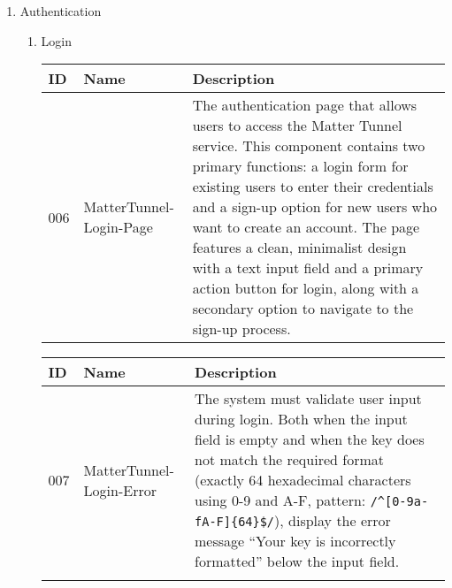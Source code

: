 \documentclass[conference]{IEEEtran}
\begin{document}
\begin{enumerate}[itemsep=2ex, parsep=1ex]
	\item Authentication
	      \begin{enumerate}[itemsep=2ex, parsep=1ex]
	      	\item Login
	      	      \begin{table}[h!]
	      	      	\def\arraystretch{1.24} \small
	      	      	\begin{tabular}{|p{1.2cm}|p{2.5cm}|p{4.0cm}|}
	      	      		\hline
	      	      		ID  & Name                    & Description                                                                                                                                                                                                                                                                                                                                                                                                                              \\
	      	      		\hline
	      	      		006 & MatterTunnel-Login-Page & The authentication page that allows users to access the Matter Tunnel service. This component contains two primary functions: a login form for existing users to enter their credentials and a sign-up option for new users who want to create an account. The page features a clean, minimalist design with a text input field and a primary action button for login, along with a secondary option to navigate to the sign-up process. \\
	      	      		\hline
	      	      	\end{tabular}
	      	      \end{table}
	      	      
	      	      \begin{table}[h!]
	      	      	\def\arraystretch{1.24} \small
	      	      	\begin{tabular}{|p{1.2cm}|p{2.5cm}|p{4.0cm}|}
	      	      		\hline
	      	      		ID  & Name                     & Description                                                                                                                                                                                                                                                                                                                 \\
	      	      		\hline
	      	      		007 & MatterTunnel-Login-Error & The system must validate user input during login. Both when the input field is empty and when the key does not match the required format (exactly 64 hexadecimal characters using 0-9 and A-F, pattern: \verb|/^[0-9a-fA-F]{64}$/|), display the error message ``Your key is incorrectly formatted'' below the input field. \\ \\
	      	      		\hline
	      	      	\end{tabular}
	      	      \end{table}
	      	      

\end{enumerate}
\end{enumerate}
\end{document}
